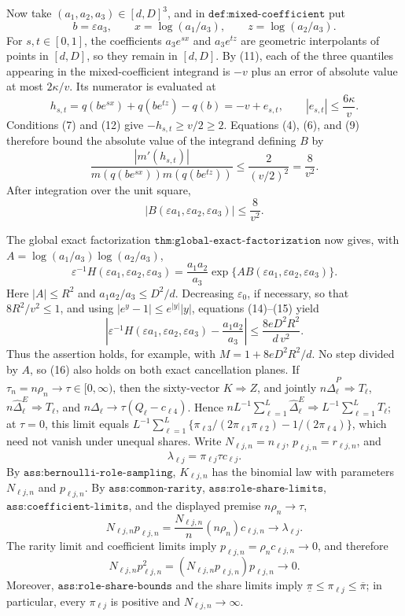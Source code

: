 Now take \((a_1,a_2,a_3)\in[d,D]^3\), and in \(\texttt{def:mixed-coefficient}\) put
\[
b=\varepsilon a_3,
\qquad x=\log(a_1/a_3),
\qquad z=\log(a_2/a_3).
\]
For \(s,t\in[0,1]\), the coefficients \(a_3e^{sx}\) and \(a_3e^{tz}\) are geometric interpolants of points in \([d,D]\), so they remain in \([d,D]\).  By (11), each of the three quantiles appearing in the mixed-coefficient integrand is \(-v\) plus an error of absolute value at most \(2\kappa/v\).  Its numerator is evaluated at
\[
h_{s,t}=q(be^{sx})+q(be^{tz})-q(b)
=-v+e_{s,t},
\qquad |e_{s,t}|\leq\frac{6\kappa}{v}.
\tag{12}
\]
Conditions (7) and (12) give \(-h_{s,t}\geq v/2\geq2\).  Equations (4), (6), and (9) therefore bound the absolute value of the integrand defining \(B\) by
\[
\frac{|m'(h_{s,t})|}
{m(q(be^{sx}))m(q(be^{tz}))}
\leq\frac{2}{(v/2)^2}=\frac8{v^2}.
\tag{13}
\]
After integration over the unit square,
\[
|B(\varepsilon a_1,\varepsilon a_2,\varepsilon a_3)|
\leq\frac8{v^2}.
\tag{14}
\]

The global exact factorization \(\texttt{thm:global-exact-factorization}\) now gives, with
\(A=\log(a_1/a_3)\log(a_2/a_3)\),
\[
\varepsilon^{-1}H(\varepsilon a_1,\varepsilon a_2,\varepsilon a_3)
=\frac{a_1a_2}{a_3}\exp\{A B(\varepsilon a_1,\varepsilon a_2,\varepsilon a_3)\}.
\tag{15}
\]
Here \(|A|\leq R^2\) and \(a_1a_2/a_3\leq D^2/d\).  Decreasing \(\varepsilon_0\), if necessary, so that \(8R^2/v^2\leq1\), and using \(|e^y-1|\leq e^{|y|}|y|\), equations (14)--(15) yield
\[
\left|\varepsilon^{-1}H(\varepsilon a_1,\varepsilon a_2,\varepsilon a_3)-\frac{a_1a_2}{a_3}\right|
\leq \frac{8eD^2R^2}{d\,v^2}.
\tag{16}
\]
Thus the assertion holds, for example, with \(M=1+8eD^2R^2/d\).  No step divided by \(A\), so (16) also holds on both exact cancellation planes.
If \(\tau_n=n\rho_n\to\tau\in[0,\infty)\), then the sixty-vector \(K\Rightarrow Z\), and jointly \(n\widehat\Delta^P_{\ell}\Rightarrow T_{\ell}\), \(n\widehat\Delta^E_{\ell}\Rightarrow T_{\ell}\), and \(n\Delta_{\ell}\to\tau(Q_{\ell}-c_{\ell4})\). Hence \(nL^{-1}\sum_{\ell=1}^{L}\widehat\Delta^E_{\ell}\Rightarrow L^{-1}\sum_{\ell=1}^{L}T_{\ell}\); at \(\tau=0\), this limit equals \(L^{-1}\sum_{\ell=1}^{L}\{\pi_{\ell3}/(2\pi_{\ell1}\pi_{\ell2})-1/(2\pi_{\ell4})\}\), which need not vanish under unequal shares.
Write \(N_{\ell j,n}=n_{\ell j}\), \(p_{\ell j,n}=r_{\ell j,n}\), and
\[
\lambda_{\ell j}=\pi_{\ell j}\tau c_{\ell j}.
\]
By \(\texttt{ass:bernoulli-role-sampling}\), \(K_{\ell j,n}\) has the binomial law with parameters \(N_{\ell j,n}\) and \(p_{\ell j,n}\).  By \(\texttt{ass:common-rarity}\), \(\texttt{ass:role-share-limits}\), \(\texttt{ass:coefficient-limits}\), and the displayed premise \(n\rho_n\to\tau\),
\[
N_{\ell j,n}p_{\ell j,n}
=\frac{N_{\ell j,n}}n(n\rho_n)c_{\ell j,n}
\longrightarrow\lambda_{\ell j}.
\tag{17}
\]
The rarity limit and coefficient limits imply \(p_{\ell j,n}=\rho_nc_{\ell j,n}\to0\), and therefore
\[
N_{\ell j,n}p_{\ell j,n}^2
=(N_{\ell j,n}p_{\ell j,n})p_{\ell j,n}\longrightarrow0.
\tag{18}
\]
Moreover, \(\texttt{ass:role-share-bounds}\) and the share limits imply
\(\underline\pi\leq\pi_{\ell j}\leq\overline\pi\); in particular, every \(\pi_{\ell j}\) is positive and \(N_{\ell j,n}\to\infty\).

